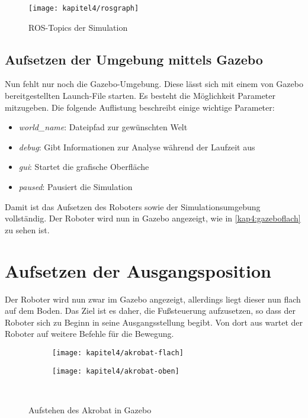 \begin{figure}[p!]
  \centering
  \texttt{[image: kapitel4/rosgraph]}
  \caption{ROS-Topics der Simulation}
  \label{Kap4:RosControlTopics}
\end{figure}

\subsection{Aufsetzen der Umgebung mittels Gazebo}

Nun fehlt nur noch die Gazebo-Umgebung. Diese lässt sich mit einem von Gazebo bereitgestellten Launch-File starten. Es besteht die Möglichkeit Parameter mitzugeben. Die folgende Auflistung beschreibt einige wichtige Parameter:
\begin{itemize}
  \item \emph{world\_name}: Dateipfad zur gewünschten Welt
  \item \emph{debug}: Gibt Informationen zur Analyse während der Laufzeit aus
  \item \emph{gui}: Startet die grafische Oberfläche
  \item \emph{paused}: Pausiert die Simulation
\end{itemize}

Damit ist das Aufsetzen des Roboters sowie der Simulationsumgebung vollständig. Der Roboter wird nun in Gazebo angezeigt, wie in \autoref{kap4:gazeboflach} zu sehen ist.

\section{Aufsetzen der Ausgangsposition}

Der Roboter wird nun zwar im Gazebo angezeigt, allerdings liegt dieser nun flach auf dem Boden. Das Ziel ist es daher, die Fußsteuerung aufzusetzen, so dass der Roboter sich zu Beginn in seine Ausgangsstellung begibt. Von dort aus wartet der Roboter auf weitere Befehle für die Bewegung.

\begin{figure}[b!]
  \centering
  \begin{subfigure}[b]{.4\linewidth}
    \centering
    \texttt{[image: kapitel4/akrobat-flach]}
    \label{kap4:gazeboflach}
  \end{subfigure}%
  \qquad
  \begin{subfigure}[b]{.4\linewidth}
    \centering
    \texttt{[image: kapitel4/akrobat-oben]}
    \label{kap4:gazebooben}
  \end{subfigure}\\
  \caption{Aufstehen des Akrobat in Gazebo}
  \label{kap4gazebo}
\end{figure}

